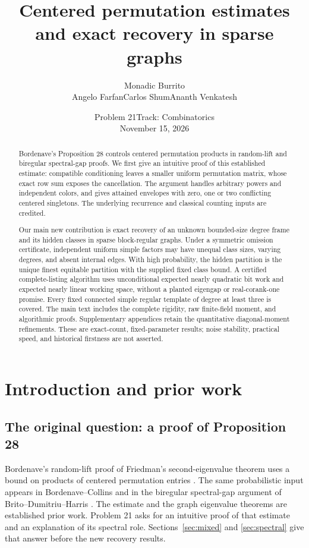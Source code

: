 \documentclass[11pt]{article}
\title{Centered permutation estimates\\ and exact recovery in sparse graphs}
\author{Monadic Burrito\\Angelo Farfan\quad Carlos Shum\quad Ananth Venkatesh}
\date{Problem 21\quad Track: Combinatorics\\November 15, 2026}
\theoremstyle{definition}
\theoremstyle{remark}
\newcommand{\1}{\mathbf 1}
\begin{document}
\maketitle
\begin{abstract}
Bordenave's Proposition 28 controls centered permutation products in
random-lift and biregular spectral-gap proofs. We first give an intuitive
proof of this established estimate: compatible conditioning leaves a
smaller uniform permutation matrix, whose exact row sum exposes the
cancellation. The argument handles arbitrary powers and independent
colors, and gives attained envelopes with zero, one or two conflicting
centered singletons. The underlying recurrence and classical counting
inputs are credited.

Our main new contribution is exact recovery of an unknown bounded-size
degree frame and its hidden classes in sparse block-regular graphs.
Under a symmetric omission certificate, independent uniform simple
factors may have unequal class sizes, varying degrees, and absent internal
edges. With high probability, the hidden partition is the unique finest
equitable partition with the supplied fixed class bound. A certified
complete-listing algorithm uses unconditional expected nearly quadratic
bit work and expected nearly linear working space, without a planted eigengap or
real-corank-one promise. Every fixed connected simple regular template of
degree at least three is covered. The main text includes the complete
rigidity, raw finite-field moment, and algorithmic proofs. Supplementary
appendices retain the quantitative diagonal-moment refinements.
These are exact-count, fixed-parameter results; noise stability, practical
speed, and historical firstness are not asserted.
\end{abstract}
\clearpage
\begingroup\small
\tableofcontents
\endgroup
\clearpage
\section{Introduction and prior work}\label{sec:report-introduction}
\subsection{The original question: a proof of Proposition 28}
Bordenave's random-lift proof of Friedman's second-eigenvalue theorem
uses a bound on products of centered permutation entries
\cite[Proposition 28]{Bordenave}. The same probabilistic input appears in
Bordenave--Collins \cite[Proposition 22]{BC} and in the biregular
spectral-gap argument of Brito--Dumitriu--Harris \cite[Lemma 5.6]{BDH}.
The estimate and the graph eigenvalue theorems are established prior
work. Problem 21 asks for an intuitive proof of that estimate and an
explanation of its spectral role. Sections~\ref{sec:mixed} and
\ref{sec:spectral} give that answer before the new recovery results.
\end{document}
